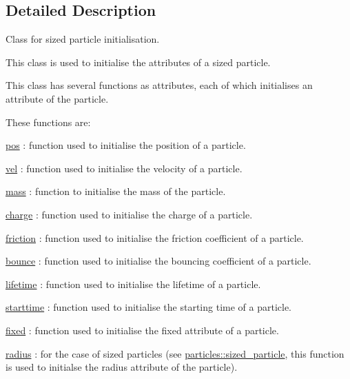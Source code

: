 \subsection{Detailed Description}
Class for sized particle initialisation. 

This class is used to initialise the attributes of a sized particle.

This class has several functions as attributes, each of which initialises an attribute of the particle.

These functions are\+:
\begin{DoxyItemize}
\item \hyperlink{classphysim_1_1emitters_1_1base__emitter_ac67584a2ca34232c1f4f04c41599df0e}{pos} \+: function used to initialise the position of a particle.
\item \hyperlink{classphysim_1_1emitters_1_1base__emitter_a9ea19d96450cff65882371b61a2294c8}{vel} \+: function used to initialise the velocity of a particle.
\item \hyperlink{classphysim_1_1emitters_1_1base__emitter_a4e1b65730afef86899544d3306f7547d}{mass} \+: function to initialise the mass of the particle.
\item \hyperlink{classphysim_1_1emitters_1_1free__emitter_a895244d2023c4cc72658d356bdb51b9a}{charge} \+: function used to initialise the charge of a particle.
\item \hyperlink{classphysim_1_1emitters_1_1free__emitter_a0167889dfac9483e7e2690efc353a7bd}{friction} \+: function used to initialise the friction coefficient of a particle.
\item \hyperlink{classphysim_1_1emitters_1_1free__emitter_a71006743e284b12904d7a4b4127ab4b8}{bounce} \+: function used to initialise the bouncing coefficient of a particle.
\item \hyperlink{classphysim_1_1emitters_1_1free__emitter_a596108fe3602299fa9035ece668653d4}{lifetime} \+: function used to initialise the lifetime of a particle.
\item \hyperlink{classphysim_1_1emitters_1_1free__emitter_af296f735438087c4acaba2242c839e49}{starttime} \+: function used to initialise the starting time of a particle.
\item \hyperlink{classphysim_1_1emitters_1_1free__emitter_a2561dbe073b699e28fbb7ad10e897567}{fixed} \+: function used to initialise the fixed attribute of a particle.
\item \hyperlink{classphysim_1_1emitters_1_1sized__emitter_a85a42d5a2e35fe7831ab889e1f4a4a45}{radius} \+: for the case of sized particles (see \hyperlink{classphysim_1_1particles_1_1sized__particle}{particles\+::sized\+\_\+particle}, this function is used to initialse the radius attribute of the particle).
\end{DoxyItemize}

